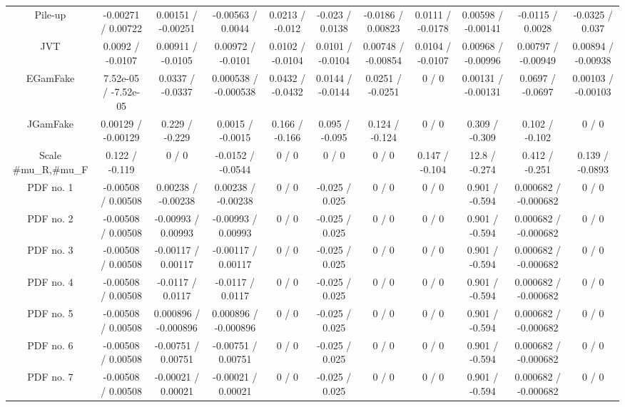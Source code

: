 \begin{table}[htbp]
\begin{center}
\begin{tabular}{|c|c|c|c|c|c|c|c|c|c|c|}
  Pile-up & -0.00271 / 0.00722 & 0.00151 / -0.00251 & -0.00563 / 0.0044 & 0.0213 / -0.012 & -0.023 / 0.0138 & -0.0186 / 0.00823 & 0.0111 / -0.0178 & 0.00598 / -0.00141 & -0.0115 / 0.0028 & -0.0325 / 0.037 \\ 
  JVT & 0.0092 / -0.0107 & 0.00911 / -0.0105 & 0.00972 / -0.0101 & 0.0102 / -0.0104 & 0.0101 / -0.0104 & 0.00748 / -0.00854 & 0.0104 / -0.0107 & 0.00968 / -0.00996 & 0.00797 / -0.00949 & 0.00894 / -0.00938 \\ 
  EGamFake & 7.52e-05 / -7.52e-05 & 0.0337 / -0.0337 & 0.000538 / -0.000538 & 0.0432 / -0.0432 & 0.0144 / -0.0144 & 0.0251 / -0.0251 & 0 / 0 & 0.00131 / -0.00131 & 0.0697 / -0.0697 & 0.00103 / -0.00103 \\ 
  JGamFake & 0.00129 / -0.00129 & 0.229 / -0.229 & 0.0015 / -0.0015 & 0.166 / -0.166 & 0.095 / -0.095 & 0.124 / -0.124 & 0 / 0 & 0.309 / -0.309 & 0.102 / -0.102 & 0 / 0 \\ 
  Scale #mu_{R},#mu_{F} & 0.122 / -0.119 & 0 / 0 & -0.0152 / -0.0544 & 0 / 0 & 0 / 0 & 0 / 0 & 0.147 / -0.104 & 12.8 / -0.274 & 0.412 / -0.251 & 0.139 / -0.0893 \\ 
  PDF no. 1 & -0.00508 / 0.00508 & 0.00238 / -0.00238 & 0.00238 / -0.00238 & 0 / 0 & -0.025 / 0.025 & 0 / 0 & 0 / 0 & 0.901 / -0.594 & 0.000682 / -0.000682 & 0 / 0 \\ 
  PDF no. 2 & -0.00508 / 0.00508 & -0.00993 / 0.00993 & -0.00993 / 0.00993 & 0 / 0 & -0.025 / 0.025 & 0 / 0 & 0 / 0 & 0.901 / -0.594 & 0.000682 / -0.000682 & 0 / 0 \\ 
  PDF no. 3 & -0.00508 / 0.00508 & -0.00117 / 0.00117 & -0.00117 / 0.00117 & 0 / 0 & -0.025 / 0.025 & 0 / 0 & 0 / 0 & 0.901 / -0.594 & 0.000682 / -0.000682 & 0 / 0 \\ 
  PDF no. 4 & -0.00508 / 0.00508 & -0.0117 / 0.0117 & -0.0117 / 0.0117 & 0 / 0 & -0.025 / 0.025 & 0 / 0 & 0 / 0 & 0.901 / -0.594 & 0.000682 / -0.000682 & 0 / 0 \\ 
  PDF no. 5 & -0.00508 / 0.00508 & 0.000896 / -0.000896 & 0.000896 / -0.000896 & 0 / 0 & -0.025 / 0.025 & 0 / 0 & 0 / 0 & 0.901 / -0.594 & 0.000682 / -0.000682 & 0 / 0 \\ 
  PDF no. 6 & -0.00508 / 0.00508 & -0.00751 / 0.00751 & -0.00751 / 0.00751 & 0 / 0 & -0.025 / 0.025 & 0 / 0 & 0 / 0 & 0.901 / -0.594 & 0.000682 / -0.000682 & 0 / 0 \\ 
  PDF no. 7 & -0.00508 / 0.00508 & -0.00021 / 0.00021 & -0.00021 / 0.00021 & 0 / 0 & -0.025 / 0.025 & 0 / 0 & 0 / 0 & 0.901 / -0.594 & 0.000682 / -0.000682 & 0 / 0 \\ 

\end{tabular}
\end{center}
\end{table}
